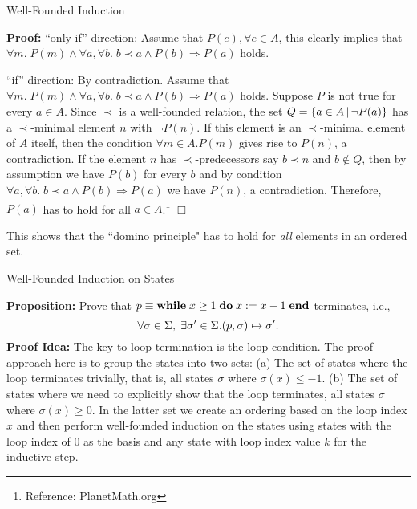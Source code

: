 \documentclass{beamer}
\begin{document}
\begin{frame}{Well-Founded Induction}
\small

{\bf Proof:} ``only-if'' direction: Assume that $P(e), \forall e \in A$, this clearly implies
that $\forall m.\; P(m) \wedge  \forall a,\forall b.\; b\prec a \wedge P(b) \Rightarrow P(a)$ holds.

\vspace{.1in}

``if'' direction: By contradiction.  Assume that $\forall m.\; P(m) \wedge  \forall a,\forall b.\; b\prec a \wedge P(b) \Rightarrow P(a)$ holds.
Suppose $P$ is not true for every $ a\in A$.  Since $ \prec$ is a well-founded relation, the set $Q = \{a\in A \,|\, \neg P(a)\}$ 
has a $ \prec$-minimal element $ n$ with $\neg P(n)$. If this element is an $ \prec$-minimal element of $ A$ itself, 
then the condition $\forall m \in A. P(m)$ gives rise to $P(n)$, a contradiction.
If the element $n$ has $ \prec$-predecessors say $b \prec n$ and $b\not\in Q$,
then by assumption we have $ P(b)$ for every $ b$  and by condition $\forall a,\forall b.\; b\prec a \wedge P(b) \Rightarrow P(a)$ we have $ P(n)$, a contradiction. Therefore, $P(a)$ has to hold for all $a\in A$.\footnote{Reference: PlanetMath.org}  $\Box$

\vspace{.2in}
This shows that the ``domino principle" has to hold for {\em all} elements in an ordered set.

\end{frame}


\begin{frame}{Well-Founded Induction on States}

\small

{\bf Proposition:} Prove that $p \equiv {\bf while}\; {x \ge 1}\;{\bf do}\;{x := x -1}\; \mbox{\bf end}$ terminates, i.e.,
\[
\forall \sigma \in \Sigma, \; \exists \sigma' \in \Sigma. ( {p}, {\sigma} ) \mapsto {\sigma'}.
\]
{\bf Proof Idea:}  The key to loop termination is the loop condition.  The proof approach here is to 
group the states into two sets: (a) The set of states where the loop terminates trivially, that is, all states $\sigma$
where $\sigma(x) \le -1$. (b) The set of states where we need to explicitly show that the loop terminates, all states
$\sigma$ where $\sigma(x) \ge 0$.  In the latter set we create an ordering based on the loop index $x$ and then
perform well-founded induction on the states using states with the loop index of $0$ as the basis and any state with loop index value $k$ for the inductive step.
\end{frame}
\end{document}
